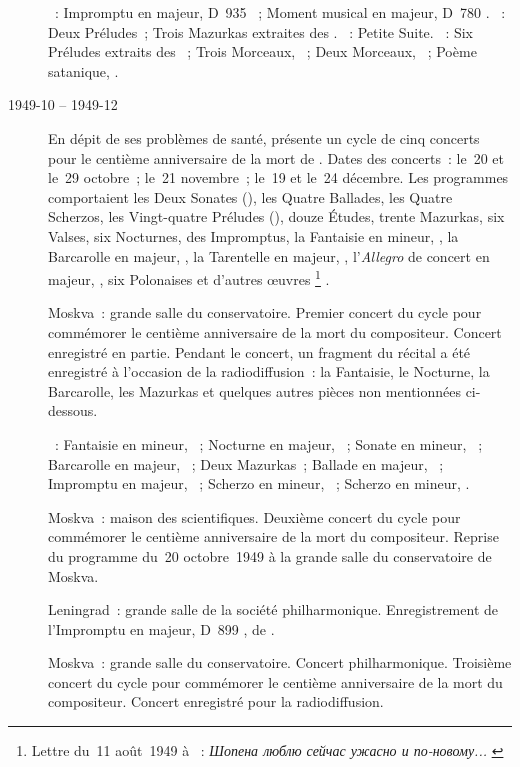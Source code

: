 \begin{description}
 \textsc{\Schubert{}}~: Impromptu en \kA \Flat majeur, D~935 ~;
 Moment musical en \kA \Flat majeur, D~780 .
 \textsc{\Liadov{}}~: Deux Préludes~; Trois Mazurkas extraites des .
 \textsc{\Borodine{}}~: Petite Suite.
 \textsc{\Scriabine{}}~: Six Préludes extraits des ~;
 Trois Morceaux, ~; Deux Morceaux, ~; Poème satanique,
 .
 \item[1949-10 -- 1949-12]
 En dépit de ses problèmes de santé, \VSofronitsky{} présente un cycle de
 cinq concerts pour le centième anniversaire de la mort de \Chopin{}.
 Dates des concerts~: le~20 et le~29 octobre~; le~21 novembre~; le~19 et
 le~24 décembre.
 Les programmes comportaient les Deux Sonates (), les Quatre
 Ballades, les Quatre Scherzos, les Vingt-quatre Préludes (), douze
 Études, trente Mazurkas, six Valses, six Nocturnes, des Impromptus, la
 Fantaisie en \kF mineur, , la Barcarolle en \kF \Sharp majeur,
 , la Tarentelle en \kA \Flat majeur, , l'\emph{Allegro}
 de concert en \kA majeur, , six Polonaises et d'autres œuvres%
 \footnote{Lettre du~11 août~1949 à \AVizel{}~:
 \foreignlanguage{russian}{\emph{Шопена люблю сейчас ужасно и по-новому...}}
 \citep[p.~171.]{Nekrasova08}}
 \citep[voir][p.~170]{Nekrasova08}.
 \item[\DateWithWeekDay{1949-10-20}]
 Moskva~: grande salle du conservatoire.
 Premier concert du cycle \Chopin{} pour commémorer le centième anniversaire
 de la mort du compositeur.
 Concert enregistré en partie.
 Pendant le concert, un fragment du récital a été enregistré à l'occasion de
 la radiodiffusion~: la Fantaisie, le Nocturne, la Barcarolle, les Mazurkas
 et quelques autres pièces non mentionnées ci-dessous.

 \textsc{\Chopin{}}~: Fantaisie en \kF mineur, ~; Nocturne en \kD
 \Flat majeur,  ~; Sonate en \kB \Flat mineur,
 ~; Barcarolle en \kF \Sharp majeur, ~; Deux Mazurkas~;
 Ballade en \kA \Flat majeur, ~; Impromptu en \kG \Flat majeur,
 ~; Scherzo en \kB \Flat mineur, ~; Scherzo en \kB mineur,
 .
 \item[\DateWithWeekDay{1949-10-29}]
 Moskva~: maison des scientifiques.
 Deuxième concert du cycle \Chopin{} pour commémorer le centième
 anniversaire de la mort du compositeur.
 Reprise du programme du~20 octobre~1949 à la grande salle du conservatoire
 de Moskva.
 \item[\DateWithWeekDay{1949-11-01}]
 Leningrad~: grande salle de la société philharmonique.
 Enregistrement de l'\hbox{Impromptu} en \kG \Flat majeur, D~899 ,
 de \Schubert{}.
 \item[\DateWithWeekDay{1949-11-21}]
 Moskva~: grande salle du conservatoire.
 Concert philharmonique.
 Troisième concert du cycle \Chopin{} pour commémorer le centième
 anniversaire de la mort du compositeur.
 Concert enregistré pour la radiodiffusion.


\end{description}
